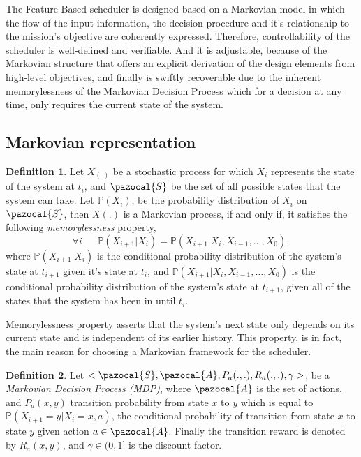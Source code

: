 \documentclass[12pt]{aastex62}
\theoremstyle{definition}
\newtheorem{defn}{Definition}
\begin{document}
The Feature-Based scheduler is designed based on a Markovian model in which the flow of the input information, the decision procedure and it's relationship to the mission's objective are coherently expressed. Therefore, controllability of the scheduler is well-defined and verifiable. And it is adjustable, because of the Markovian structure that offers an explicit derivation of the design elements from high-level objectives, and finally is swiftly recoverable due to the inherent memorylessness of the Markovian Decision Process which for a decision at any time, only requires the current state of the system.

\subsection{Markovian representation}\label{sec_Markov}
\begin{defn}
Let $X_{(.)}$ be a stochastic process for which $X_i$ represents the state of the system at $t_i$, and $\pazocal{S}$ be the set of all possible states that the system can take. Let $\mathbb{P}(X_i)$, be the probability distribution of $X_i$ on $\pazocal{S}$, then $X(.)$ is a Markovian process, if and only if, it satisfies the following \textit{memorylessness} property,
\begin{equation*}
\forall i ~~~~~~~\mathbb{P}(X_{{i+1}} | X_{i}) = \mathbb{P}(X_{{i+1}} | X_{i}, X_{{i-1}},\dots, X_{0}),
\end{equation*}
where $\mathbb{P}(X_{{i+1}} | X_{i})$ is the conditional probability distribution of the system's state at $t_{i+1}$ given it's state at $t_i$, and $\mathbb{P}(X_{{i+1}} | X_{i}, X_{{i-1}},\dots, X_{0})$ is the conditional probability distribution of the system's state at $t_{i+1}$, given all of the states that the system has been in until $t_i$.
\end{defn}
Memorylessness property asserts that the system's next state only depends on its current state and is independent of its earlier history. This property, is in fact, the main reason for choosing a Markovian framework for the scheduler. 
\begin{defn}
Let $<\pazocal{S},\pazocal{A}, P_a(.,.), R_a(.,.), \gamma>$, be a \textit{Markovian Decision Process (MDP)}, where $\pazocal{A}$ is the set of actions, and $P_a(x, y)$ transition probability from state $x$ to $y$ which is equal to $\mathbb{P}(X_{i+1}=y | X_i=x, a)$, the conditional probability of transition from state $x$ to state $y$ given action $a \in  \pazocal{A}$. Finally the transition reward is denoted by $R_a(x,y)$, and $\gamma \in (0,1]$ is the discount factor.
\end{defn}
\end{document}
